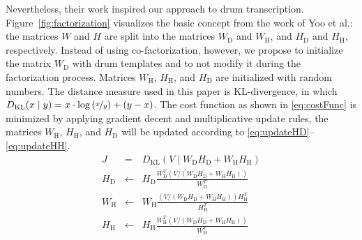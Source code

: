 \documentclass[a4paper]{article}
\newcommand{\figref}[1]{\mbox{Figure~\ref{#1}}}
\begin{document}
Nevertheless, their work inspired our approach to drum transcription. \figref{fig:factorization} visualizes the basic concept from the work of Yoo et al.: the matrices $W$ and $H$ are split into the  matrices $W_\mathrm{D}$ and $W_\mathrm{H}$, and  $H_\mathrm{D}$ and $H_\mathrm{H}$, respectively. Instead of using co-factorization, however, we propose to initialize the matrix $W_\mathrm{D}$ with drum templates and to not modify it during the factorization process. Matrices $W_\mathrm{H}$, $H_\mathrm{H}$, and $H_\mathrm{D}$ are initialized with random numbers. 
The distance measure used in this paper is KL-divergence, in which \(D_\mathrm{KL}(x \mid y) = x\cdot\log\left(\nicefrac{x}{y}\right) + (y - x)\). The cost function as shown in \eqref{eq:costFunc} is minimized by applying gradient decent and multiplicative update rules, the matrices  $W_\mathrm{H}$, $H_\mathrm{H}$, and $H_\mathrm{D}$ will be updated according to \eqref{eq:updateHD}--\eqref{eq:updateHH}.  %
\begin{eqnarray}
\label{eq:costFunc}
J &=& D_\mathrm{KL}(V \mid W_\mathrm{D}H_\mathrm{D} + W_\mathrm{H}H_\mathrm{H})\\
\label{eq:updateHD}
H_\mathrm{D} &\leftarrow& H_\mathrm{D}\frac{W_\mathrm{D}^T( V / (W_\mathrm{D}H_\mathrm{D} + W_\mathrm{H}H_\mathrm{H}))}{W_\mathrm{D}^T}\\
%
\label{eq:updateWH}
W_\mathrm{H} &\leftarrow& W_\mathrm{H}\frac{(V/(W_\mathrm{D}H_\mathrm{D} + W_\mathrm{H}H_\mathrm{H})) H_\mathrm{H}^T}{H_\mathrm{H}^T}\\
%
\label{eq:updateHH}
H_\mathrm{H} &\leftarrow& H_\mathrm{H}\frac{W_\mathrm{H}^T (V/(W_\mathrm{D}H_\mathrm{D} + W_\mathrm{H}H_\mathrm{H}))}{W_\mathrm{H}^T}
\end{eqnarray}
\end{document}
